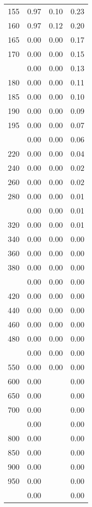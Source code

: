\begin{table}[ht]
\begin{tabular}{lccc}
  155 & 0.97 & 0.10 & 0.23 \\ 
  160 & 0.97 & 0.12 & 0.20 \\ 
  165 & 0.00 & 0.00 & 0.17 \\ 
  170 & 0.00 & 0.00 & 0.15 \\ 
   \addlinespace
175 & 0.00 & 0.00 & 0.13 \\ 
  180 & 0.00 & 0.00 & 0.11 \\ 
  185 & 0.00 & 0.00 & 0.10 \\ 
  190 & 0.00 & 0.00 & 0.09 \\ 
  195 & 0.00 & 0.00 & 0.07 \\ 
   \addlinespace
200 & 0.00 & 0.00 & 0.06 \\ 
  220 & 0.00 & 0.00 & 0.04 \\ 
  240 & 0.00 & 0.00 & 0.02 \\ 
  260 & 0.00 & 0.00 & 0.02 \\ 
  280 & 0.00 & 0.00 & 0.01 \\ 
   \addlinespace
300 & 0.00 & 0.00 & 0.01 \\ 
  320 & 0.00 & 0.00 & 0.01 \\ 
  340 & 0.00 & 0.00 & 0.00 \\ 
  360 & 0.00 & 0.00 & 0.00 \\ 
  380 & 0.00 & 0.00 & 0.00 \\ 
   \addlinespace
400 & 0.00 & 0.00 & 0.00 \\ 
  420 & 0.00 & 0.00 & 0.00 \\ 
  440 & 0.00 & 0.00 & 0.00 \\ 
  460 & 0.00 & 0.00 & 0.00 \\ 
  480 & 0.00 & 0.00 & 0.00 \\ 
   \addlinespace
500 & 0.00 & 0.00 & 0.00 \\ 
  550 & 0.00 & 0.00 & 0.00 \\ 
  600 & 0.00 &  & 0.00 \\ 
  650 & 0.00 &  & 0.00 \\ 
  700 & 0.00 &  & 0.00 \\ 
   \addlinespace
750 & 0.00 &  & 0.00 \\ 
  800 & 0.00 &  & 0.00 \\ 
  850 & 0.00 &  & 0.00 \\ 
  900 & 0.00 &  & 0.00 \\ 
  950 & 0.00 &  & 0.00 \\ 
   \addlinespace
1000 & 0.00 &  & 0.00 \\ 
   \bottomrule
\end{tabular}
\end{table}
